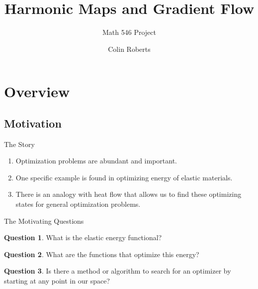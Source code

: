 \documentclass[usenames,dvipsnames]{beamer}
\title{Harmonic Maps and Gradient Flow}
\subtitle{Math 546 Project}
\author{Colin Roberts}
\theoremstyle{definition}
\newtheorem*{question}{Question}
\theoremstyle{theorem}
\begin{document}
{
\begin{frame}
\titlepage
\end{frame}
}




\section{Overview}
    
    \subsection{Motivation}
    
        \begin{frame}{The Story}
            \begin{enumerate}
                \item Optimization problems are abundant and important.
                \pause
                \item One specific example is found in optimizing energy of elastic materials.
                \pause
                \item There is an analogy with heat flow that allows us to find these optimizing states for general optimization problems.
            \end{enumerate}
        \end{frame}
        
        \begin{frame}{The Motivating Questions}
            \begin{question}
            What is the elastic energy functional?
            \end{question}
            
            \begin{question}
            What are the functions that optimize this energy?
            \end{question}
            
            \begin{question}
            Is there a method or algorithm to search for an optimizer by starting at any point in our space?
            \end{question}
        \end{frame}
        
\end{document}
